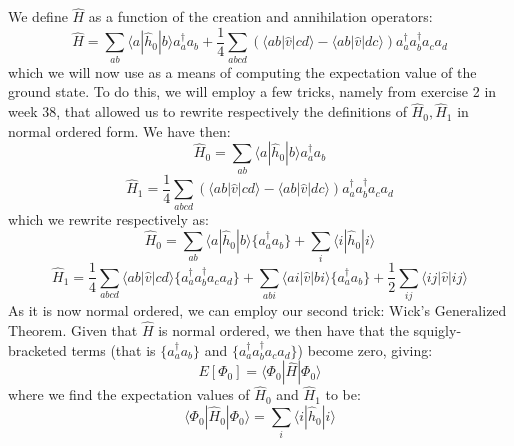 \documentclass{article}
\begin{document}
\section{}
We define $\hat H$ as a function of the creation and annihilation operators:
\begin{equation*}
    \hat H = \sum_{a b} \langle a | \hat h_0 | b \rangle a^\dagger_a a_b + \frac{1}{4} \sum_{abcd} \left(\langle a b| \hat v | cd \rangle - \langle a b | \hat v | d c \rangle \right) a^\dagger_a a^\dagger_b a_c a_d
\end{equation*}
which we will now use as a means of computing the expectation value of the ground state. To do this, we will employ a few tricks, namely from exercise 2 in week 38, that allowed us to rewrite respectively the definitions of $\hat H_0, \hat H_1$ in normal ordered form.
\newline
We have then:
\begin{equation*}
    \hat H_0 = \sum_{a b} \langle a | \hat h_0 | b \rangle a_a^\dagger a_b
\end{equation*}
\begin{equation*}
    \hat H_1  = \frac{1}{4} \sum_{abcd} \left(\langle a b | \hat v | c d \rangle - \langle a b | \hat v | d c \rangle \right) a^\dagger_a a^\dagger_b a_c a_d
\end{equation*}
which we rewrite respectively as:
\begin{equation}
    \hat H_0 = \sum_{a b} \langle a | \hat h_0 | b \rangle \{ a_a^\dagger a_b \} + \sum_i \langle i |\hat h_0 | i \rangle 
\end{equation}
\begin{equation}
    \hat H_1 = \frac{1}{4} \sum_{a b c d } \langle a b | \hat v | c d \rangle \{a_a^\dagger a_b^\dagger a_c a_d \} + \sum_{a b i} \langle a i | \hat v | b i \rangle \{ a_a^\dagger a_b \} + \frac{1}{2} \sum_{ij} \langle ij | \hat v| ij \rangle
\end{equation}
As it is now normal ordered, we can employ our second trick: Wick's Generalized Theorem. Given that $\hat H$ is normal ordered, we then have that the squigly-bracketed terms (that is $\{a_a^\dagger a_b\}$ and $\{a_a^\dagger a_b^\dagger a_c a_d \}$) become zero, giving:
\begin{equation*}
    E\left[\Phi_0 \right] = \langle \Phi_0 | \hat H | \Phi_0 \rangle
\end{equation*}
where we find the expectation values of $\hat H_0$ and $\hat H_1$ to be:
\begin{equation*}
    \langle \Phi_0 | \hat H_0 | \Phi_0 \rangle = \sum_i \langle i | \hat h_0 | i \rangle
\end{equation*}
\end{document}

